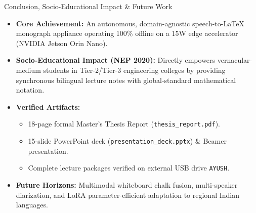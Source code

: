 \documentclass[aspectratio=169,10pt]{beamer}
\begin{document}
\begin{frame}{Conclusion, Socio-Educational Impact \& Future Work}
  \begin{itemize}
    \item \textbf{Core Achievement:} An autonomous, domain-agnostic speech-to-LaTeX monograph appliance operating 100\% offline on a 15W edge accelerator (NVIDIA Jetson Orin Nano).
    \item \textbf{Socio-Educational Impact (NEP 2020):} Directly empowers vernacular-medium students in Tier-2/Tier-3 engineering colleges by providing synchronous bilingual lecture notes with global-standard mathematical notation.
    \item \textbf{Verified Artifacts:}
    \begin{itemize}
      \footnotesize
      \item 18-page formal Master's Thesis Report (\texttt{thesis\_report.pdf}).
      \item 15-slide PowerPoint deck (\texttt{presentation\_deck.pptx}) \& Beamer presentation.
      \item Complete lecture packages verified on external USB drive \texttt{AYUSH}.
    \end{itemize}
    \item \textbf{Future Horizons:} Multimodal whiteboard chalk fusion, multi-speaker diarization, and LoRA parameter-efficient adaptation to regional Indian languages.
  \end{itemize}
\end{frame}
\end{document}
